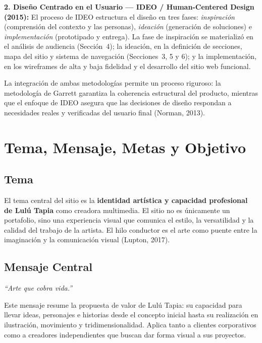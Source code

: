 \documentclass[12pt, letterpaper]{article}
\begin{document}
\textbf{2. Diseño Centrado en el Usuario — IDEO / Human-Centered Design (2015):} El proceso de IDEO estructura el diseño en tres fases: \textit{inspiración} (comprensión del contexto y las personas), \textit{ideación} (generación de soluciones) e \textit{implementación} (prototipado y entrega). La fase de inspiración se materializó en el análisis de audiencia (Sección~4); la ideación, en la definición de secciones, mapa del sitio y sistema de navegación (Secciones~3, 5 y 6); y la implementación, en los wireframes de alta y baja fidelidad y el desarrollo del sitio web funcional.

La integración de ambas metodologías permite un proceso riguroso: la metodología de Garrett garantiza la coherencia estructural del producto, mientras que el enfoque de IDEO asegura que las decisiones de diseño respondan a necesidades reales y verificadas del usuario final (Norman, 2013).


\section{Tema, Mensaje, Metas y Objetivo}

\subsection{Tema}

El tema central del sitio es la \textbf{identidad artística y capacidad profesional de Lulú Tapia} como creadora multimedia. El sitio no es únicamente un portafolio, sino una experiencia visual que comunica el estilo, la versatilidad y la calidad del trabajo de la artista. El hilo conductor es el arte como puente entre la imaginación y la comunicación visual (Lupton, 2017).

\subsection{Mensaje Central}

\begin{tcolorbox}[
  colback=luluDark, colframe=luluDark,
  arc=4pt, boxrule=0pt,
  left=10pt, right=10pt, top=10pt, bottom=10pt
]
\centering
{\Large\itshape\color{white} ``Arte que cobra vida.''}
\end{tcolorbox}

Este mensaje resume la propuesta de valor de Lulú Tapia: su capacidad para llevar ideas, personajes e historias desde el concepto inicial hasta su realización en ilustración, movimiento y tridimensionalidad. Aplica tanto a clientes corporativos como a creadores independientes que buscan dar forma visual a sus proyectos.
\end{document}
